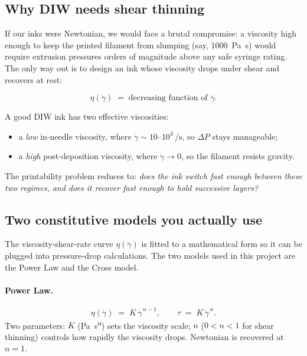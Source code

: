 \documentclass[11pt,a4paper]{article}
\newcommand{\gd}{\dot{\gamma}}
\begin{document}
\subsection{Why DIW needs shear thinning}

If our inks were Newtonian, we would face a brutal compromise: a
viscosity high enough to keep the printed filament from slumping
(say, \SI{1000}{\Pa\s}) would require extrusion pressures orders of
magnitude above any safe syringe rating. The only way out is to design
an ink whose viscosity drops under shear and recovers at rest:

\begin{equation}
\eta(\gd) \;=\; \text{decreasing function of } \gd.
\label{eq:shear_thin_general}
\end{equation}

\begin{intuitionbox}
A good DIW ink has two effective viscosities:
\begin{itemize}[leftmargin=1.4em,itemsep=1pt]
\item a \emph{low} in-needle viscosity, where $\gd\sim 10$--$10^3\,\si{\per\s}$,
  so $\Delta P$ stays manageable;
\item a \emph{high} post-deposition viscosity, where $\gd\to 0$, so the
  filament resists gravity.
\end{itemize}
The printability problem reduces to: \emph{does the ink switch fast
enough between these two regimes, and does it recover fast enough to
hold successive layers?}
\end{intuitionbox}

\subsection{Two constitutive models you actually use}
\label{sec:models}

The viscosity-shear-rate curve $\eta(\gd)$ is fitted to a
mathematical form so it can be plugged into pressure-drop calculations.
The two models used in this project are the Power Law and the Cross model.

\paragraph{Power Law.}
\begin{equation}
\eta(\gd) \;=\; K\,\gd^{\,n-1}, \qquad
\tau \;=\; K\,\gd^{\,n}.
\label{eq:powerlaw}
\end{equation}
Two parameters: $K$ (\si{\Pa\s^n}) sets the viscosity scale; $n$
($0<n<1$ for shear thinning) controls how rapidly the viscosity drops.
Newtonian is recovered at $n=1$.
\end{document}
